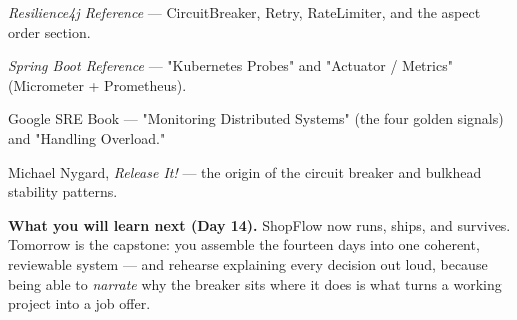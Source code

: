 \begin{wbitem}
  \item \emph{Resilience4j Reference} --- CircuitBreaker, Retry, RateLimiter, and the aspect order section.
  \item \emph{Spring Boot Reference} --- "Kubernetes Probes" and "Actuator / Metrics" (Micrometer + Prometheus).
  \item Google SRE Book --- "Monitoring Distributed Systems" (the four golden signals) and "Handling Overload."
  \item Michael Nygard, \emph{Release It!} --- the origin of the circuit breaker and bulkhead stability patterns.
\end{wbitem}

\begin{keyidea}
\textbf{What you will learn next (Day 14).} ShopFlow now runs, ships, and survives. Tomorrow is the capstone: you assemble the fourteen days into one coherent, reviewable system --- and rehearse explaining every decision out loud, because being able to \emph{narrate} why the breaker sits where it does is what turns a working project into a job offer.
\end{keyidea}

